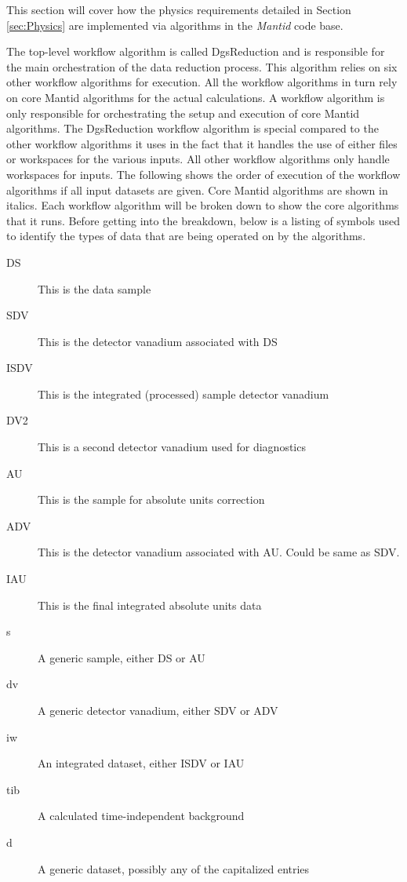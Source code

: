 This section will cover how the physics requirements detailed in Section \ref{sec:Physics} are implemented via algorithms in the \textit{Mantid} code base.

The top-level workflow algorithm is called DgsReduction and is responsible for the main orchestration of the data reduction process. This algorithm relies on six other workflow algorithms for execution. All the workflow algorithms in turn rely on core Mantid algorithms for the actual calculations. A workflow algorithm is only responsible for orchestrating the setup and execution of core Mantid algorithms. The DgsReduction workflow algorithm is special compared to the other workflow algorithms it uses in the fact that it handles the use of either files or workspaces for the various inputs. All other workflow algorithms only handle workspaces for inputs. The following shows the order of execution of the workflow algorithms if all input datasets are given. Core Mantid algorithms are shown in italics. Each workflow algorithm will be broken down to show the core algorithms that it runs. Before getting into the breakdown, below is a listing of symbols used to identify the types of data that are being operated on by the algorithms.

\begin{description}
\item[DS] This is the data sample
\item[SDV] This is the detector vanadium associated with DS
\item[ISDV] This is the integrated (processed) sample detector vanadium
\item[DV2] This is a second detector vanadium used for diagnostics
\item[AU] This is the sample for absolute units correction
\item[ADV] This is the detector vanadium associated with AU. Could be same as SDV.
\item[IAU] This is the final integrated absolute units data
\item[s] A generic sample, either DS or AU
\item[dv] A generic detector vanadium, either SDV or ADV
\item[iw] An integrated dataset, either ISDV or IAU
\item[tib] A calculated time-independent background
\item[d] A generic dataset, possibly any of the capitalized entries
\end{description}

